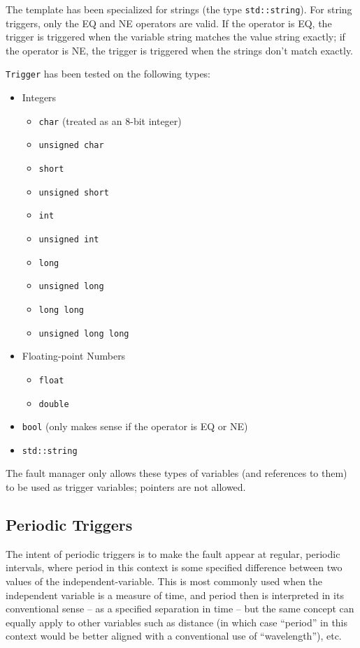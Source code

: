 \documentclass[11pt,fleqn]{report}
\begin{document}
\par The template has been specialized for strings (the type
\verb"std::string").
For string triggers, only the EQ and NE operators are valid.
If the operator is EQ, the trigger is triggered when the variable string matches
the value string exactly; if the operator is NE, the trigger is triggered when
the strings don't match exactly.

\par \verb"Trigger" has been tested on the following types:
\begin{itemize}
  \item Integers \begin{itemize}
    \item \verb"char" (treated as an 8-bit integer)
    \item \verb"unsigned char"
    \item \verb"short"
    \item \verb"unsigned short"
    \item \verb"int"
    \item \verb"unsigned int"
    \item \verb"long"
    \item \verb"unsigned long"
    \item \verb"long long"
    \item \verb"unsigned long long"
  \end{itemize}
  \item Floating-point Numbers \begin{itemize}
    \item \verb"float"
    \item \verb"double"
  \end{itemize}
  \item \verb"bool" (only makes sense if the operator is EQ or NE)
  \item \verb"std::string"
\end{itemize}
The fault manager only allows these types of variables (and references to them)
to be used as trigger variables; pointers are not allowed.

\subsection{Periodic Triggers} \label{intro_periodic}

The intent of periodic triggers is to make the fault appear at regular, periodic
intervals, where
period in this context is some specified difference between two values of the
independent-variable. This is most commonly used when the independent variable
is a measure of time, and period then is interpreted in its conventional sense
-- as a specified separation in time -- but the same concept can equally apply
to other variables such as distance (in which case ``period'' in this context
would be better aligned with a conventional use of ``wavelength''), etc.
\end{document}
